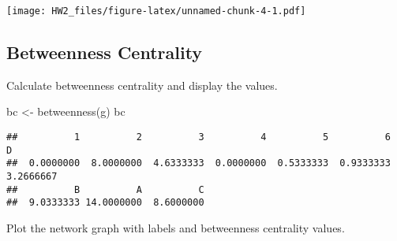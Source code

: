\documentclass[
]{article}
\newenvironment{Shaded}{\begin{snugshade}}{\end{snugshade}}
\newcommand{\AttributeTok}[1]{\textcolor[rgb]{0.77,0.63,0.00}{#1}}
\newcommand{\CommentTok}[1]{\textcolor[rgb]{0.56,0.35,0.01}{\textit{#1}}}
\newcommand{\DecValTok}[1]{\textcolor[rgb]{0.00,0.00,0.81}{#1}}
\newcommand{\FloatTok}[1]{\textcolor[rgb]{0.00,0.00,0.81}{#1}}
\newcommand{\FunctionTok}[1]{\textcolor[rgb]{0.00,0.00,0.00}{#1}}
\newcommand{\NormalTok}[1]{#1}
\newcommand{\OtherTok}[1]{\textcolor[rgb]{0.56,0.35,0.01}{#1}}
\newcommand{\SpecialCharTok}[1]{\textcolor[rgb]{0.00,0.00,0.00}{#1}}
\newcommand{\StringTok}[1]{\textcolor[rgb]{0.31,0.60,0.02}{#1}}
\begin{document}
\texttt{[image: HW2\_files/figure-latex/unnamed-chunk-4-1.pdf]}

\hypertarget{betweenness-centrality}{%
\subsection{Betweenness Centrality}\label{betweenness-centrality}}

Calculate betweenness centrality and display the values.

\begin{Shaded}
\begin{Highlighting}[]
\NormalTok{bc }\OtherTok{\textless{}{-}} \FunctionTok{betweenness}\NormalTok{(g)}
\NormalTok{bc}
\end{Highlighting}
\end{Shaded}

\begin{verbatim}
##          1          2          3          4          5          6          D 
##  0.0000000  8.0000000  4.6333333  0.0000000  0.5333333  0.9333333  3.2666667 
##          B          A          C 
##  9.0333333 14.0000000  8.6000000
\end{verbatim}

Plot the network graph with labels and betweenness centrality values.

\begin{Shaded}
\end{Shaded}
\end{document}
